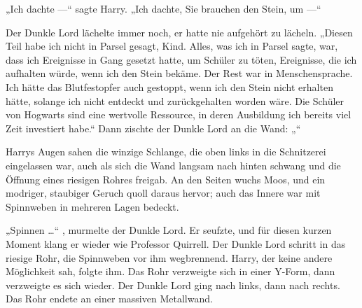 „Ich dachte —“ sagte Harry.
„Ich dachte, Sie brauchen den Stein, um —“

Der Dunkle Lord lächelte immer noch, er hatte nie aufgehört zu lächeln.
„Diesen Teil habe ich nicht in Parsel gesagt, Kind. Alles, was ich in Parsel sagte, war, dass ich Ereignisse in Gang gesetzt hatte, um Schüler zu töten, Ereignisse, die ich aufhalten würde, wenn ich den Stein bekäme. Der Rest war in Menschensprache. Ich hätte das Blutfestopfer auch gestoppt, wenn ich den Stein nicht erhalten hätte, solange ich nicht entdeckt und zurückgehalten worden wäre. Die Schüler von Hogwarts sind eine wertvolle Ressource, in deren Ausbildung ich bereits viel Zeit investiert habe.“
Dann zischte der Dunkle Lord an die Wand:
„“

Harrys Augen sahen die winzige Schlange, die oben links in die Schnitzerei eingelassen war, auch als sich die Wand langsam nach hinten schwang und die Öffnung eines riesigen Rohres freigab. An den Seiten wuchs Moos, und ein modriger, staubiger Geruch quoll daraus hervor; auch das Innere war mit Spinnweben in mehreren Lagen bedeckt.

„Spinnen …“ , murmelte der Dunkle Lord.
Er seufzte, und für diesen kurzen Moment klang er wieder wie Professor Quirrell.
Der Dunkle Lord schritt in das riesige Rohr, die Spinnweben vor ihm wegbrennend. Harry, der keine andere Möglichkeit sah, folgte ihm.
Das Rohr verzweigte sich in einer Y-Form, dann verzweigte es sich wieder. Der Dunkle Lord ging nach links, dann nach rechts. Das Rohr endete an einer massiven Metallwand.

